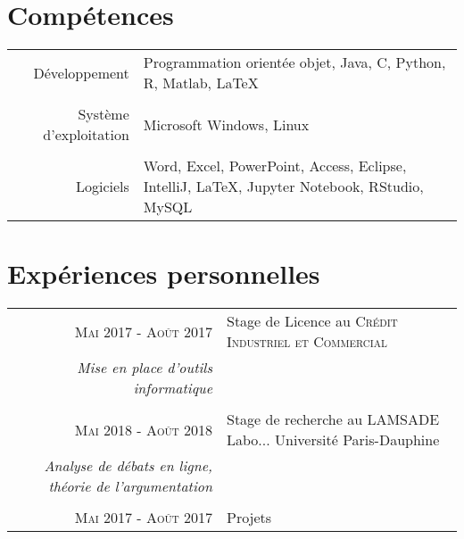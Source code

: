 \documentclass[a4paper,10pt]{article}
\begin{document}
\section{Compétences}
\begin{tabular}{rl}	
 Développement & Programmation orientée objet, Java, C, Python, R, Matlab, LaTeX\\&\\
Système d'exploitation & Microsoft Windows, Linux\\&\\
Logiciels & Word, Excel, PowerPoint, Access, Eclipse, IntelliJ, LaTeX, Jupyter Notebook, RStudio, MySQL
\end{tabular}

\section{Expériences personnelles}
\begin{tabular}{rl}	
 \textsc{Mai} 2017 - \textsc{Août} 2017 & Stage de Licence au \textsc{Crédit Industriel et Commercial}\\
 \emph{\small{Mise en place d'outils informatique}}\\&\\
 \textsc{Mai} 2018 - \textsc{Août} 2018 & Stage de recherche au \textsc{LAMSADE} Labo... Université Paris-Dauphine\\
 \emph{\small{Analyse de débats en ligne, théorie de l'argumentation}}\\&\\
 \textsc{Mai} 2017 - \textsc{Août} 2017 & Projets

\end{tabular}

\end{document}
